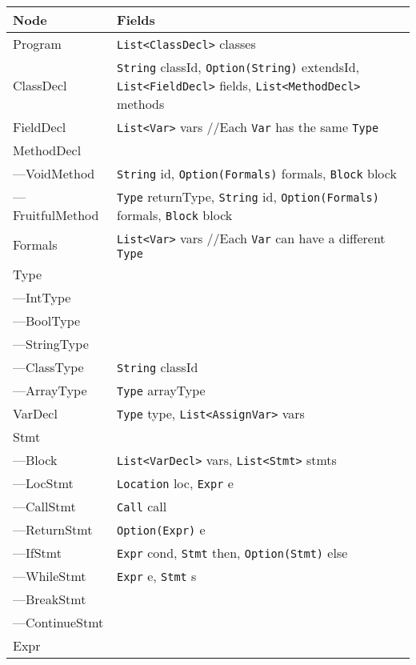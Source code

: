 \documentclass{article}
\newcommand\tab[1][1cm]{\hspace*{#1}}
\begin{document}
\begin{longtable}{p{} | p{}}
    \textbf{Node} & \textbf{Fields} \\\hline
    Program & \texttt{List<ClassDecl>} classes \\\hline
    ClassDecl & \texttt{String} classId, \texttt{Option(String)} extendsId, \texttt{List<FieldDecl>} fields, \texttt{List<MethodDecl>} methods \\\hline
    FieldDecl & \texttt{List<Var>} vars \tab\tab //Each \texttt{Var} has the same \texttt{Type} \\\hline
    MethodDecl & \\\hline
    ---VoidMethod & \texttt{String} id, \texttt{Option(Formals)} formals, \texttt{Block} block \\\hline
    ---FruitfulMethod & \texttt{Type} returnType, \texttt{String} id, \texttt{Option(Formals)} formals, \texttt{Block} block \\\hline
    Formals & \texttt{List<Var>} vars \tab\tab //Each \texttt{Var} can have a different \texttt{Type} \\\hline
    Type & \\\hline
    ---IntType & \\\hline
    ---BoolType & \\\hline
    ---StringType & \\\hline
    ---ClassType & \texttt{String} classId \\\hline
    ---ArrayType & \texttt{Type} arrayType \\\hline
    VarDecl & \texttt{Type} type, \texttt{List<AssignVar>} vars \\\hline
    Stmt & \\\hline
    ---Block & \texttt{List<VarDecl>} vars, \texttt{List<Stmt>} stmts \\\hline
    ---LocStmt & \texttt{Location} loc, \texttt{Expr} e \\\hline
    ---CallStmt & \texttt{Call} call \\\hline
    ---ReturnStmt & \texttt{Option(Expr)} e \\\hline
    ---IfStmt & \texttt{Expr} cond, \texttt{Stmt} then, \texttt{Option(Stmt)} else \\\hline
    ---WhileStmt & \texttt{Expr} e, \texttt{Stmt} s \\\hline
    ---BreakStmt & \\\hline
    ---ContinueStmt & \\\hline
    Expr & \\\hline

\end{longtable}
\end{document}
